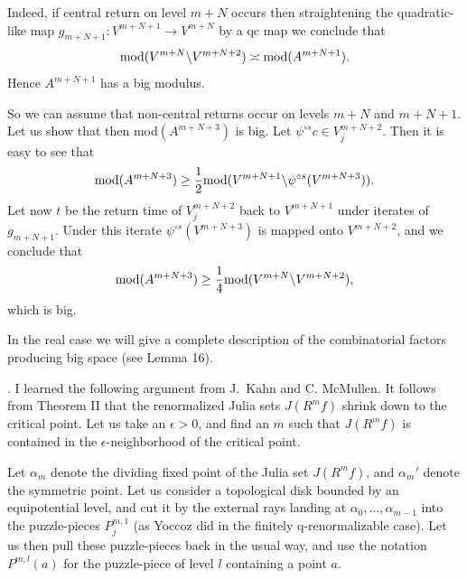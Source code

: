 Indeed, if central return on level $m+N$ occurs then 
straightening the quadratic-like map 
$g_{m+N+1}: V^{m+N+1}\rightarrow V^{m+N}$ by a qc map we conclude that
$${\rm mod}( V^{m+N}\backslash  V^{m+N+2})\asymp {\rm mod}(A^{m+N+1}).$$
Hence $A^{m+N+1}$ has a big modulus.

 

So we can assume that non-central returns occur on levels $m+N$  and
$m+N+1$. Let us show that then mod$(A^{m+N+3})$ is big.
Let $\psi^{\circ s} c\in V_j^{m+N+2}$. Then it is easy to see that
$${\rm  mod}(A^{m+N+3})\geq 
 {1\over 2}{\rm mod} (V^{m+N+1}\backslash \psi^{\circ s}( V^{m+N+3})).$$
Let now $t$ be the return time of $V^{m+N+2}_j$ back to $V^{m+N+1}$ under
iterates of $g_{m+N+1}$. Under this iterate  $\psi^{\circ s} (V^{m+N+3})$
 is mapped
onto $V^{m+N+2}$, and we conclude that
$${\rm  mod}(A^{m+N+3})\geq 
 {1\over 4}{\rm mod} (V^{m+N}\backslash V^{m+N+2}),$$
which is big.  \QED

\smallskip{}
In the real case we will give a complete description of the combinatorial
factors producing big space (see Lemma 16).



\medskip{}.  I learned the
following argument from J.~Kahn and C. McMullen.
 It follows from Theorem II  that the
renormalized Julia sets $J(R^m f)$ shrink down to the critical point.
Let us take an $\epsilon>0$, and find an $m$ such that $J(R^m f)$ is
contained in the $\epsilon$-neighborhood of the critical point.

Let $\alpha_m$ denote
the dividing fixed point of the Julia set $J(R^m f)$, and $\alpha_m'$
denote the symmetric point. Let us consider a topological disk
bounded by an equipotential level, and cut it by the
external rays landing at $\alpha_0,...,\alpha_{m-1}$ into the puzzle-pieces
$P^{m,1}_j$ (as Yoccoz did in the finitely q-renormalizable case).
 Let us then pull these puzzle-pieces back in the usual way,
and use the notation $P^{m,l}(a)$ for the puzzle-piece of level $l$
containing a point $a$.

